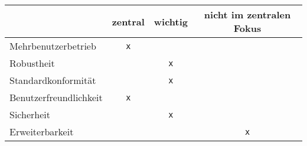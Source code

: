 
\begin{table}[H]
	\centering
	\begin{tabular}{lccc}
		\toprule
		& zentral & wichtig & nicht im zentralen Fokus \\
		\midrule
		Mehrbenutzerbetrieb & \texttt{x} & & \\
		Robustheit & & \texttt{x} & \\
		Standardkonformität & & \texttt{x} & \\
		Benutzerfreundlichkeit & \texttt{x} & & \\
		Sicherheit & &  \texttt{x} & \\
		Erweiterbarkeit & & & \texttt{x} \\
		\bottomrule
	\end{tabular}
\end{table}